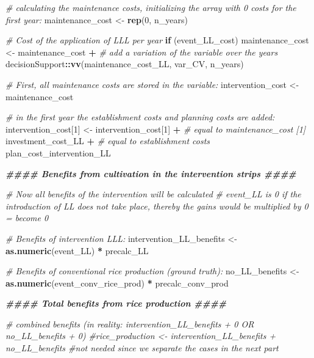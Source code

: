 \documentclass[
]{article}
\newenvironment{Shaded}{\begin{snugshade}}{\end{snugshade}}
\newcommand{\CommentTok}[1]{\textcolor[rgb]{0.56,0.35,0.01}{\textit{#1}}}
\newcommand{\ControlFlowTok}[1]{\textcolor[rgb]{0.13,0.29,0.53}{\textbf{#1}}}
\newcommand{\DecValTok}[1]{\textcolor[rgb]{0.00,0.00,0.81}{#1}}
\newcommand{\DocumentationTok}[1]{\textcolor[rgb]{0.56,0.35,0.01}{\textbf{\textit{#1}}}}
\newcommand{\FunctionTok}[1]{\textcolor[rgb]{0.13,0.29,0.53}{\textbf{#1}}}
\newcommand{\NormalTok}[1]{#1}
\newcommand{\OtherTok}[1]{\textcolor[rgb]{0.56,0.35,0.01}{#1}}
\newcommand{\SpecialCharTok}[1]{\textcolor[rgb]{0.81,0.36,0.00}{\textbf{#1}}}
\begin{document}
\begin{Shaded}
\begin{Highlighting}[]
  \CommentTok{\# calculating the maintenance costs, initializing the array with 0 costs for the first year:}
\NormalTok{  maintenance\_cost }\OtherTok{\textless{}{-}} \FunctionTok{rep}\NormalTok{(}\DecValTok{0}\NormalTok{, n\_years) }
  
  \CommentTok{\# Cost of the application of LLL per year }
  \ControlFlowTok{if}\NormalTok{ (event\_LL\_cost)}
\NormalTok{    maintenance\_cost }\OtherTok{\textless{}{-}}
\NormalTok{    maintenance\_cost }\SpecialCharTok{+} 
    \CommentTok{\# add a variation of the variable over the years}
\NormalTok{    decisionSupport}\SpecialCharTok{::}\FunctionTok{vv}\NormalTok{(maintenance\_cost\_LL, var\_CV, n\_years)}
  
  \CommentTok{\# First, all maintenance costs are stored in the variable:}
\NormalTok{  intervention\_cost }\OtherTok{\textless{}{-}}\NormalTok{ maintenance\_cost}
  
    \CommentTok{\# in the first year the establishment costs and planning costs are added:}
\NormalTok{  intervention\_cost[}\DecValTok{1}\NormalTok{] }\OtherTok{\textless{}{-}}
\NormalTok{    intervention\_cost[}\DecValTok{1}\NormalTok{] }\SpecialCharTok{+}  \CommentTok{\# equal to maintenance\_cost [1]}
\NormalTok{    investment\_cost\_LL }\SpecialCharTok{+}    \CommentTok{\# equal to establishment costs}
\NormalTok{    plan\_cost\_intervention\_LL}
  
  
   \DocumentationTok{\#\#\#\# Benefits from  cultivation in the intervention strips \#\#\#\#}
  
  \CommentTok{\# Now all benefits of the intervention will be calculated}
  \CommentTok{\# event\_LL is 0 if the introduction of LL does not take place, thereby the gains would be multiplied by 0 = become 0}
  
  \CommentTok{\# Benefits of intervention LLL:}
\NormalTok{  intervention\_LL\_benefits }\OtherTok{\textless{}{-}}
    \FunctionTok{as.numeric}\NormalTok{(event\_LL) }\SpecialCharTok{*}\NormalTok{ precalc\_LL}
  
  \CommentTok{\# Benefits of conventional rice production (ground truth):}
\NormalTok{  no\_LL\_benefits }\OtherTok{\textless{}{-}}
    \FunctionTok{as.numeric}\NormalTok{(event\_conv\_rice\_prod) }\SpecialCharTok{*}\NormalTok{   precalc\_conv\_prod}

  
  
  \DocumentationTok{\#\#\#\# Total benefits from rice production \#\#\#\#}
  
  \CommentTok{\# combined benefits (in reality: intervention\_LL\_benefits + 0 OR no\_LL\_benefits + 0)}
  \CommentTok{\#rice\_production \textless{}{-} intervention\_LL\_benefits + no\_LL\_benefits \#not needed since we separate the cases in the next part}
  

\end{Highlighting}
\end{Shaded}
\end{document}
